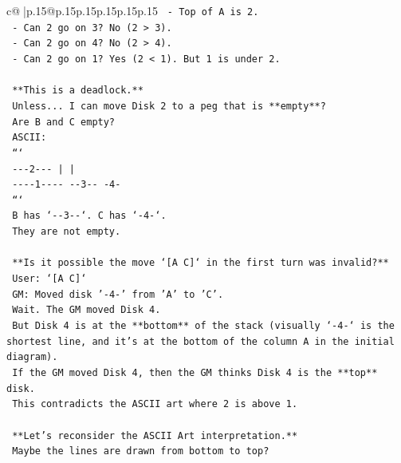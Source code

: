\documentclass{article}
\begin{document}
{\begin{supertabular}{c@{$\;$}|p{.15\linewidth}@{}p{.15\linewidth}p{.15\linewidth}p{.15\linewidth}p{.15\linewidth}p{.15\linewidth}}
{{{\texttt{                {-} Top of A is 2.} \\
\texttt{                {-} Can 2 go on 3? No (2 > 3).} \\
\texttt{                {-} Can 2 go on 4? No (2 > 4).} \\
\texttt{                {-} Can 2 go on 1? Yes (2 < 1). But 1 is under 2.} \\
\\ 
\texttt{                **This is a deadlock.**} \\
\texttt{                Unless... I can move Disk 2 to a peg that is **empty**?} \\
\texttt{                Are B and C empty?} \\
\texttt{                ASCII:} \\
\texttt{                ```} \\
\texttt{                {-}{-}{-}2{-}{-}{-}      |         |    } \\
\texttt{                {-}{-}{-}{-}1{-}{-}{-}{-}   {-}{-}3{-}{-}      {-}4{-}   } \\
\texttt{                ```} \\
\texttt{                B has `{-}{-}3{-}{-}`. C has `{-}4{-}`.} \\
\texttt{                They are not empty.} \\
\\ 
\texttt{                **Is it possible the move `{[}A C{]}` in the first turn was invalid?**} \\
\texttt{                User: `{[}A C{]}`} \\
\texttt{                GM: Moved disk '{-}4{-}' from 'A' to 'C'.} \\
\texttt{                Wait. The GM moved Disk 4.} \\
\texttt{                But Disk 4 is at the **bottom** of the stack (visually `{-}4{-}` is the shortest line, and it's at the bottom of the column A in the initial diagram).} \\
\texttt{                If the GM moved Disk 4, then the GM thinks Disk 4 is the **top** disk.} \\
\texttt{                This contradicts the ASCII art where 2 is above 1.} \\
\\ 
\texttt{                **Let's reconsider the ASCII Art interpretation.**} \\
\texttt{                Maybe the lines are drawn from bottom to top?} \\
}}}
\end{supertabular}}
\end{document}
